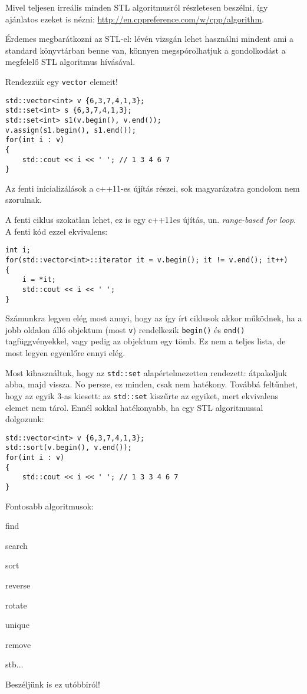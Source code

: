 \documentclass[a4paper,11.5pt]{article}
\begin{document}
	Mivel teljesen irreális minden STL algoritmusról részletesen beszélni, így ajánlatos ezeket is nézni: \url{http://en.cppreference.com/w/cpp/algorithm}.
	
	Érdemes megbarátkozni az STL-el: lévén vizsgán lehet használni mindent ami a standard könyvtárban benne van, könnyen megspórolhatjuk a gondolkodást a megfelelő STL algoritmus hívásával.
	
	\medskip
	Rendezzük egy \texttt{vector} elemeit!
	\begin{lstlisting}
std::vector<int> v {6,3,7,4,1,3};
std::set<int> s {6,3,7,4,1,3};
std::set<int> s1(v.begin(), v.end());
v.assign(s1.begin(), s1.end());
for(int i : v)
{
	std::cout << i << ' '; // 1 3 4 6 7 
}
	\end{lstlisting}
	\begin{note}
		Az fenti inicializálások a c++11-es újítás részei, sok magyarázatra gondolom nem szorulnak.
		
		A fenti ciklus szokatlan lehet, ez is egy c++11es újítás, un. \textit{range-based for loop}. A fenti kód ezzel ekvivalens:
		\begin{lstlisting}
int i;
for(std::vector<int>::iterator it = v.begin(); it != v.end(); it++)
{
	i = *it;
	std::cout << i << ' ';
}
		\end{lstlisting}
		Számunkra legyen elég most annyi, hogy az így írt ciklusok akkor működnek, ha a jobb oldalon álló objektum (most \texttt{v}) rendelkezik \texttt{begin()} és \texttt{end()} tagfüggvényekkel, vagy pedig az objektum egy tömb. Ez nem a teljes lista, de most legyen egyenlőre ennyi elég.
	\end{note}
	Most kihasználtuk, hogy az \texttt{std::set} alapértelmezetten rendezett: átpakoljuk abba, majd vissza. No persze, ez minden, csak nem hatékony. Továbbá feltűnhet, hogy az egyik 3-as kiesett: az \texttt{std::set} kiszűrte az egyiket, mert ekvivalens elemet nem tárol. Ennél sokkal hatékonyabb, ha egy STL algoritmussal dolgozunk:
	\begin{lstlisting}
std::vector<int> v {6,3,7,4,1,3};
std::sort(v.begin(), v.end());
for(int i : v)
{
	std::cout << i << ' '; // 1 3 3 4 6 7 
}
	\end{lstlisting}
	Fontosabb algoritmusok:
	\begin{compactitem}
		\item find
		\item search
		\item sort
		\item reverse
		\item rotate
		\item unique
		\item remove
		\item stb...
	\end{compactitem}
	Beszéljünk is ez utóbbiról!
	
\end{document}
